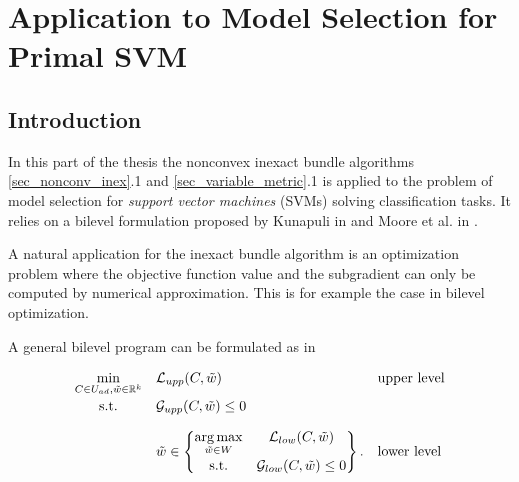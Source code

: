 \section{Application to Model Selection for Primal SVM}
\label{sec_bilevel}


\subsection{Introduction}

In this part of the thesis the nonconvex inexact bundle algorithms \ref{sec_nonconv_inex}.1 and \ref{sec_variable_metric}.1 is applied to the problem of model selection for \emph{support vector machines} (SVMs) solving classification tasks.
It relies on a bilevel formulation proposed by Kunapuli in \cite{Kunapuli2008} and Moore et al. in \cite{Moore2011}.

A natural application for the inexact bundle algorithm is an optimization problem where the objective function value and the subgradient can only be computed by numerical approximation. This is for example the case in bilevel optimization.

A general bilevel program can be formulated as in \cite[p. 20]{Kunapuli2008}

\begin{equation}
	\begin{array}{cll}
	\displaystyle\min_{C \in U_{ad}, \tilde{w} \in \R^k} & \mathcal{L}_{upp}(C,\tilde{w}) & \text{upper level} \vspace{0.5ex}\\
	\text{s.t.} & \mathcal{G}_{upp}(C,\tilde{w}) \leq 0 & \vspace{1em}\\
	& \tilde{w} \in \begin{Bmatrix} \displaystyle\argmax_{\tilde{w}\in W} & \mathcal{L}_{low}(C,\tilde{w}) \vspace{0.5ex}\\
	                        \text{s.t.} & \mathcal{G}_{low}(C,\tilde{w}) \leq 0 
													\end{Bmatrix}. & \text{lower level}
	\end{array}
	\label{bilevel}
\end{equation}

